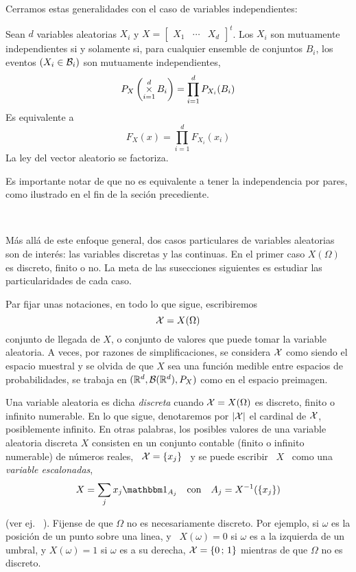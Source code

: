 Cerramos estas generalidades con el caso de variables independientes:
%
\begin{definicion}[Independencia]
  Sean $d$  variables aleatorias  $X_i$ y  $X = \begin{bmatrix}  X_1 &  \cdots &
    X_d  \end{bmatrix}^t$.   Los  $X_i$   son  mutuamente  independientes  si  y
  solamente si,  para cualquier ensemble  de conjuntos $B_i$, los  eventos $(X_i
  \in \mathcal{B}_i)$ son mutuamente independientes, \ie
  \[
  P_X\left( \operatorname*{\times}_{i=1}^d B_i \right) = \prod_{i=1}^d P_{X_i}(B_i)
  \]
  Es equivalente a
  \[
  F_X(x) = \prod_{i=1}^d F_{X_i}(x_i)
  \]
  La  ley  del  vector  aleatorio  se factoriza.  
\end{definicion}
%
\noindent Es importante notar de que  no es equivalente a tener la independencia
por pares, como ilustrado en el fin de la seci\'on precediente.

\

M\'as  all\'a de  este  enfoque  general, dos  casos  particulares de  variables
aleatorias son  de inter\'es:  las variables discretas  y las continuas.   En el
primer caso  $X(\Omega)$ es discreto, finito  o no.  La meta  de las susecciones
siguientes es estudiar las particularidades de cada caso.

Par fijar unas notaciones, en todo lo que sigue, escribiremos
%
\[
\mathcal{X} = X(\Omega)
\]
%
conjunto de  llegada de $X$, o conjunto  de valores que puede  tomar la variable
aleatoria.  A  veces, por  razones de simplificaciones,  se considera  $\mathcal{X}$ como
siendo el  espacio muestral  y se olvida  de que  $X$ sea una  funci\'on medible
entre espacios de probabilidades,  \ie se trabaja en $(\mathbb{R}^d,\mathcal{B}(\mathbb{R}^d),P_X)$
como en el espacio preimagen.




\label{sec:MP:VADiscreta}

\begin{definicion}
  Una  variable aleatoria es  dicha {\it  discreta} cuando  $\mathcal{X} =  X(\Omega)$ es
  discreto,  finito o  infinito numerable.   En  lo que  sigue, denotaremos  por
  $|\mathcal{X}|$  el cardinal  de $\mathcal{X}$,  posiblemente infinito.  En otras  palabras, los
  posibles  valores de  una  variable  aleatoria discreta  $X$  consisten en  un
  conjunto contable (finito  o infinito numerable) de n\'umeros  reales, \ $\mathcal{X} =
  \{ x_j \}$ \ y se puede escribir \ $X$ \ como una {\it variable escalonadas},
  \[
  X = \sum_j x_j \un_{A_j} \quad \mbox{con} \quad A_j = X^{-1}(\{ x_j \})
  \]
\end{definicion}
%
\noindent (ver ej.  ~\cite{AthLah06, HogMck13}).  Fijense de que  $\Omega$ no es
necesariamente discreto.  Por ejemplo, si  $\omega$ es la posici\'on de un punto
sobre una linea, y \ $X(\omega) = 0$ si $\omega$ es a la izquierda de un umbral, y
$X(\omega) = 1$ si $\omega$  es a su derecha, $\mathcal{X} = \{ 0 \,  ; \, 1 \}$ mientras
de que $\Omega$ no es discreto.

